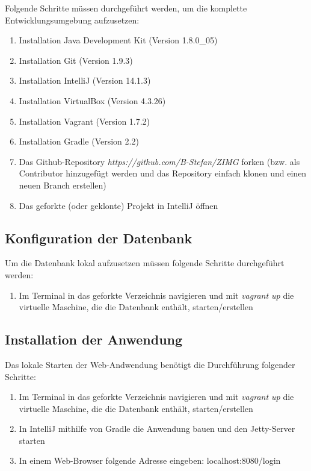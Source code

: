 \documentclass[12pt, oneside, a4paper]{article}		%
\begin{document}
Folgende Schritte müssen durchgeführt werden, um die komplette Entwicklungsumgebung aufzusetzen:

\begin{enumerate}
	\item Installation Java Development Kit (Version 1.8.0\_05)
	\item Installation Git (Version 1.9.3)
	\item Installation IntelliJ (Version 14.1.3)
	\item Installation VirtualBox (Version 4.3.26)
	\item Installation Vagrant (Version 1.7.2)
	\item Installation Gradle (Version 2.2)
	\item Das Github-Repository \textit{https://github.com/B-Stefan/ZIMG} forken (bzw. als Contributor hinzugefügt werden und das Repository einfach klonen und einen neuen Branch erstellen)
	\item Das geforkte (oder geklonte) Projekt in IntelliJ öffnen
\end{enumerate}

\subsection{Konfiguration der Datenbank}

Um die Datenbank lokal aufzusetzen müssen folgende Schritte durchgeführt werden:

\begin{enumerate}
	\item Im Terminal in das geforkte Verzeichnis navigieren und mit \textit{vagrant up} die virtuelle Maschine, die die Datenbank enthält, starten/erstellen
\end{enumerate}

\subsection{Installation der Anwendung}

Das lokale Starten der Web-Andwendung benötigt die Durchführung folgender Schritte:

\begin{enumerate}
	\item Im Terminal in das geforkte Verzeichnis navigieren und mit \textit{vagrant up} die virtuelle Maschine, die die Datenbank enthält, starten/erstellen
	\item In IntelliJ mithilfe von Gradle die Anwendung bauen und den Jetty-Server starten
	\item In einem Web-Browser folgende Adresse eingeben: localhost:8080/login
\end{enumerate}
\end{document}
